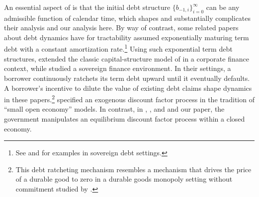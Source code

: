 \documentclass[12pt]{article}
\newcommand{\NW}[1]{{\textcolor{blue}{#1}}}
\begin{document}



{An essential aspect  of \cite{LucasStokey1983}  is that the  initial debt structure $\{ b_{-1,i} \}_{i=0}^\infty$ can be any admissible function of calendar time, which shapes and substantially complicates their analysis and our analysis here. By way of contrast,  some  related  papers about debt dynamics have for  tractability   %
 assumed  exponentially maturing term debt with a constant amortization rate.\footnote{See  \cite{arellano2012default} and \cite{chatterjee2012maturity} for examples in sovereign debt settings.} 
Using such exponential  term  debt structures,  \cite{demarzo2021leverage}  extended the classic capital-structure model  of \citep{leland1994corporate} in a corporate finance context, while  \cite*{demarzo2023sovereign}  studied  a sovereign finance environment. In their settings,  a borrower continuously ratchets  its term debt upward  until it eventually defaults.  A borrower's incentive to dilute the value of existing  debt claims shape dynamics in these papers.\footnote{This debt ratcheting mechanism resembles a mechanism that drives the price of a durable good to zero in a durable goods monopoly setting without commitment studied by \citet{coase1972durability,stokey1981rational}.  }  %
} %
  \cite*{demarzo2023sovereign} specified an exogenous %
discount factor process in the tradition of ``small open economy'' models. In contrast, in \cite{LucasStokey1983}, \citet{aiyagari2002optimal},  and \citet{debortoli2021optimal} and our  paper,   the government manipulates an  equilibrium discount factor process within a closed economy. 
\end{document}
